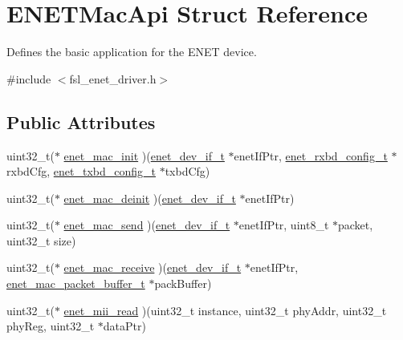 \hypertarget{structENETMacApi}{}\section{E\+N\+E\+T\+Mac\+Api Struct Reference}
\label{structENETMacApi}


Defines the basic application for the E\+N\+ET device.  




{\ttfamily \#include $<$fsl\+\_\+enet\+\_\+driver.\+h$>$}

\subsection*{Public Attributes}
\begin{DoxyCompactItemize}
\item 
uint32\+\_\+t($\ast$ \hyperlink{structENETMacApi_a52c96a89ccf5d536663fa4fabad6b153}{enet\+\_\+mac\+\_\+init} )(\hyperlink{group__enet__driver_ga497f30fbc93952e93d9fb8cf78480b75}{enet\+\_\+dev\+\_\+if\+\_\+t} $\ast$enet\+If\+Ptr, \hyperlink{group__enet__driver_gab090bee9d2d43fafd258c5cf9db43405}{enet\+\_\+rxbd\+\_\+config\+\_\+t} $\ast$rxbd\+Cfg, \hyperlink{group__enet__driver_gaa9b0e870936a3a951241a0d2d95e22cd}{enet\+\_\+txbd\+\_\+config\+\_\+t} $\ast$txbd\+Cfg)
\item 
uint32\+\_\+t($\ast$ \hyperlink{structENETMacApi_a9c92145416f2d7d6fb5e24f8c4ba1494}{enet\+\_\+mac\+\_\+deinit} )(\hyperlink{group__enet__driver_ga497f30fbc93952e93d9fb8cf78480b75}{enet\+\_\+dev\+\_\+if\+\_\+t} $\ast$enet\+If\+Ptr)
\item 
uint32\+\_\+t($\ast$ \hyperlink{structENETMacApi_a17dab812d1907002224b2baa72a6fffe}{enet\+\_\+mac\+\_\+send} )(\hyperlink{group__enet__driver_ga497f30fbc93952e93d9fb8cf78480b75}{enet\+\_\+dev\+\_\+if\+\_\+t} $\ast$enet\+If\+Ptr, uint8\+\_\+t $\ast$packet, uint32\+\_\+t size)
\item 
uint32\+\_\+t($\ast$ \hyperlink{structENETMacApi_a7714f2ddedc0b7939c6160ab1abaff5d}{enet\+\_\+mac\+\_\+receive} )(\hyperlink{group__enet__driver_ga497f30fbc93952e93d9fb8cf78480b75}{enet\+\_\+dev\+\_\+if\+\_\+t} $\ast$enet\+If\+Ptr, \hyperlink{group__enet__driver_gac8cd75bf78539c0237a1895b5b573557}{enet\+\_\+mac\+\_\+packet\+\_\+buffer\+\_\+t} $\ast$pack\+Buffer)
\item 
uint32\+\_\+t($\ast$ \hyperlink{structENETMacApi_a80c2c85982eb99a2576d4027d7fae09f}{enet\+\_\+mii\+\_\+read} )(uint32\+\_\+t instance, uint32\+\_\+t phy\+Addr, uint32\+\_\+t phy\+Reg, uint32\+\_\+t $\ast$data\+Ptr)

\end{DoxyCompactItemize}
